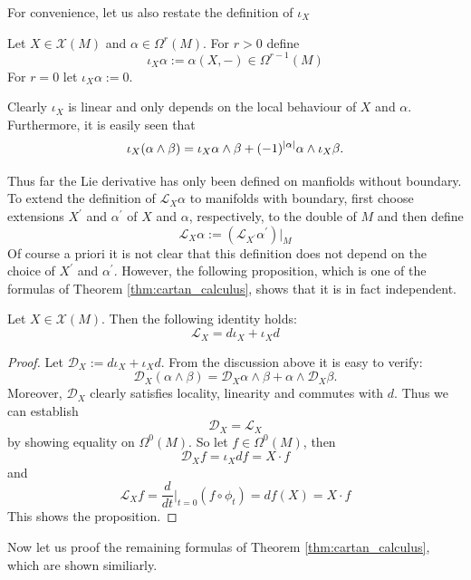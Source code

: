 For convenience, let us also restate the definition of $\iota_X$
\begin{definition}
    Let $X \in \mathscr{X}(M)$ and $\alpha \in \Omega^r(M)$. For $r > 0$ define
    \[
    \iota_X \alpha := \alpha(X,-) \in \Omega^{r-1}(M)
    \]
    For $r=0$ let $\iota_X \alpha := 0$.
\end{definition}

Clearly $\iota_X$ is linear and only depends on the local behaviour of $X$ and $\alpha$. Furthermore, it is easily seen that 
\[
\iota_X(\alpha \wedge \beta) = \iota_X\alpha \wedge \beta + (-1)^{\lvert\alpha\rvert} \alpha \wedge \iota_X\beta.
\]

Thus far the Lie derivative has only been defined on manfiolds without boundary. To extend the definition of $\mathcal{L}_X\alpha$ to manifolds with boundary, first choose extensions $X^\prime$ and $\alpha^\prime$ of $X$ and $\alpha$, respectively, to the double of $M$ and then define
\[
\mathcal{L}_X \alpha := (\mathcal{L}_{X^\prime}\alpha^\prime)|_M
\]
Of course a priori it is not clear that this definition does not depend on the choice of $X^\prime$ and $\alpha^\prime$. However, the following proposition, which is one of the formulas of Theorem \ref{thm:cartan_calculus}, shows that it is in fact independent.

\begin{proposition}
    \label{cartan_cal:prop:magic_formula}
    Let $X \in \mathscr{X}(M)$. Then the following identity holds:
    \[\mathcal{L}_X = d\iota_X + \iota_Xd\]
\end{proposition}
\begin{proof}
    Let $\mathcal{D}_X := d\iota_X + \iota_Xd$. From the discussion above it is easy to verify:
    \[
    \mathcal{D}_X(\alpha \wedge \beta) = \mathcal{D}_X\alpha \wedge \beta + \alpha \wedge \mathcal{D}_X\beta.
    \]
    Moreover, $\mathcal{D}_X$ clearly satisfies locality, linearity and commutes with $d$. Thus we can establish 
    \[
    \mathcal{D}_X = \mathcal{L}_X
    \]
    by showing equality on $\Omega^0(M)$. So let $f \in \Omega^0(M)$, then 
    \[
    \mathcal{D}_X f = \iota_Xdf = X \cdot f
    \]
    and
    \[
    \mathcal{L}_Xf = \frac{d}{dt}\bigg|_{t=0} (f \circ \phi_t) = df(X) = X \cdot f
    \]
    This shows the proposition.
\end{proof}

Now let us proof the remaining formulas of Theorem \ref{thm:cartan_calculus}, which are shown similiarly.

